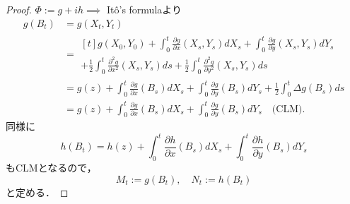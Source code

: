 \documentclass{jsarticle}
\begin{document}
\begin{proof}
    $\Phi:=g+ih\implies $ It\^{o}'s formulaより
    \begin{align}
        g(B_t)
        &= g(X_t,Y_t) \\
        &= 
        \begin{multlined}[t]
            g(X_0, Y_0)
            + \int_0^t\frac{\partial g}{\partial x}(X_s, Y_s)dX_s
            + \int_0^t\frac{\partial g}{\partial y}(X_s, Y_s)dY_s \\
            + \frac{1}{2}\int_0^t\frac{\partial^2 g}{\partial x^2}(X_s, Y_s)ds
            + \frac{1}{2}\int_0^t\frac{\partial^2 g}{\partial y^2}(X_s, Y_s)ds
        \end{multlined}\\
        &= g(z)
        + \int_0^t\frac{\partial g}{\partial x}(B_s)dX_s
        + \int_0^t\frac{\partial g}{\partial y}(B_s)dY_s
        + \frac{1}{2}\int_0^t\Delta g(B_s)ds \\
        &= g(z)
        + \int_0^t\frac{\partial g}{\partial x}(B_s)dX_s
        + \int_0^t\frac{\partial g}{\partial y}(B_s)dY_s
        \quad\text{(CLM)}.
    \end{align}
    同様に
    $$
    h(B_t)
    =h(z)
    + \int_0^t\frac{\partial h}{\partial x}(B_s)dX_s
    + \int_0^t\frac{\partial h}{\partial y}(B_s)dY_s
    $$
    もCLMとなるので，
    $$
    M_t:= g(B_t), \quad
    N_t:= h(B_t)
    $$
    と定める．
\end{proof}
\end{document}
